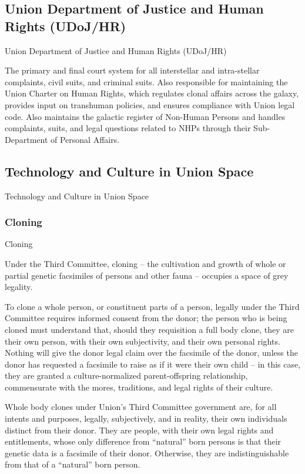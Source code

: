 \subsection{Union Department of Justice and Human Rights (UDoJ/HR)}
Union Department of Justice and Human Rights (UDoJ/HR)

The primary and final court system for all interstellar and intra-stellar complaints, civil suits, and
criminal suits. Also responsible for maintaining the Union Charter on Human Rights, which
regulates clonal affairs across the galaxy, provides input on transhuman policies, and ensures
compliance with Union legal code. Also maintains the galactic register of Non-Human Persons
and handles complaints, suits, and legal questions related to NHPs through their Sub-
Department of Personal Affairs.

\subsection{Technology and Culture in Union Space}

Technology and Culture in Union Space
\subsubsection{Cloning}
Cloning

Under the Third Committee, cloning -- the cultivation and growth of whole or partial genetic
facsimiles of persons and other fauna -- occupies a space of grey legality.


To clone a whole person, or constituent parts of a person, legally under the Third Committee
requires informed consent from the donor; the person who is being cloned must understand that,
should they requisition a full body clone, they are their own person, with their own subjectivity,
and their own personal rights. Nothing will give the donor legal claim over the facsimile of the
donor, unless the donor has requested a facsimile to raise as if it were their own child -- in this
case, they are granted a culture-normalized parent-offspring relationship, commensurate with the
mores, traditions, and legal rights of their culture.


Whole body clones under Union’s Third Committee government are, for all intents and purposes,
legally, subjectively, and in reality, their own individuals distinct from their donor. They are people,
with their own legal rights and entitlements, whose only difference from “natural” born persons is
that their genetic data is a facsimile of their donor. Otherwise, they are indistinguishable from that
of a “natural” born person.



